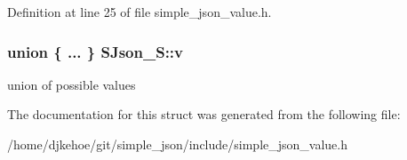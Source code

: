 Definition at line 25 of file simple\+\_\+json\+\_\+value.\+h.

\subsubsection[{\texorpdfstring{v}{v}}]{\setlength{\rightskip}{0pt plus 5cm}union \{ ... \}  S\+Json\+\_\+\+S\+::v}\hypertarget{structSJson__S_a34c41be372d7bbe614b312cef2051b99}{}\label{structSJson__S_a34c41be372d7bbe614b312cef2051b99}
union of possible values 

The documentation for this struct was generated from the following file\+:\begin{DoxyCompactItemize}
\item 
/home/djkehoe/git/simple\+\_\+json/include/simple\+\_\+json\+\_\+value.\+h\end{DoxyCompactItemize}
